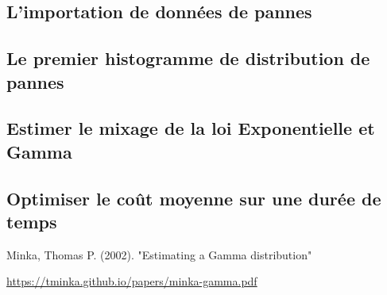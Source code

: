 \documentclass[10pt,a4paper]{article}
\begin{document}
\subsection{L'importation de données de pannes}
\label{annexe:import_pannes}

\subsection{Le premier histogramme de distribution de pannes}
\label{annexe:premier_histo}

\subsection{Estimer le mixage de la loi Exponentielle et Gamma}
\label{annexe:em_exp_gamma}

\subsection{Optimiser le coût moyenne sur une durée de temps}
\label{annexe:optim_e_c}


\begin{thebibliography}{9}
     Minka, Thomas P. (2002). "Estimating a Gamma distribution"

    \url{https://tminka.github.io/papers/minka-gamma.pdf}
\end{thebibliography}
\end{document}
